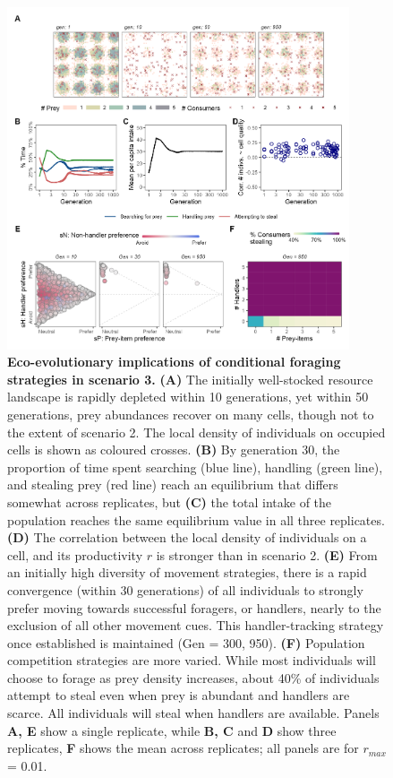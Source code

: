 \begin{figure}[t!]
    \centering
    \includegraphics[width=0.9\textwidth]{figures/kleptomove/fig_04.png}
    \caption{
        \textbf{Eco-evolutionary implications of conditional foraging strategies in scenario 3.}
        \textbf{(A)} The initially well-stocked resource landscape is rapidly depleted within 10 generations, yet within 50 generations, prey abundances recover on many cells, though not to the extent of scenario 2.
        The local density of individuals on occupied cells is shown as coloured crosses. 
        \textbf{(B)} By generation 30, the proportion of time spent searching (blue line), handling (green line), and stealing prey (red line) reach an equilibrium that differs somewhat across replicates, but \textbf{(C)} the total intake of the population reaches the same equilibrium value in all three replicates.
        \textbf{(D)} The correlation between the local density of individuals on a cell, and its productivity $r$ is stronger than in scenario 2.
        \textbf{(E)} From an initially high diversity of movement strategies, there is a rapid convergence (within 30 generations) of all individuals to strongly prefer moving towards successful foragers, or handlers, nearly to the exclusion of all other movement cues.
        This handler-tracking strategy once established is maintained (Gen = 300, 950).
        \textbf{(F)} Population competition strategies are more varied. While most individuals will choose to forage as prey density increases, about 40\% of individuals attempt to steal even when prey is abundant and handlers are scarce.
        All individuals will steal when handlers are available.
        Panels \textbf{A, E} show a single replicate, while \textbf{B, C} and \textbf{D} show three replicates, \textbf{F} shows the mean across replicates; all panels are for $r_{max}$ = 0.01.
    }
    \label{klepto_fig_04}
\end{figure}

